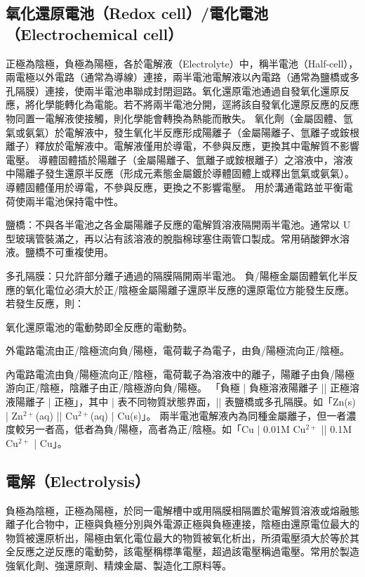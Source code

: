 \documentclass[a4paper,12pt]{article}
\begin{document}
\subsection{氧化還原電池（Redox cell）/電化電池（Electrochemical cell）}
正極為陰極，負極為陽極，各於電解液（Electrolyte）中，稱半電池（Half-cell），兩電極以外電路（通常為導線）連接，兩半電池電解液以內電路（通常為鹽橋或多孔隔膜）連接，使兩半電池串聯成封閉迴路。氧化還原電池通過自發氧化還原反應，將化學能轉化為電能。若不將兩半電池分開，逕將該自發氧化還原反應的反應物同置一電解液使接觸，則化學能會轉換為熱能而散失。
氧化劑（金屬固體、氫氣或氨氣）於電解液中，發生氧化半反應形成陽離子（金屬陽離子、氫離子或銨根離子）釋放於電解液中。電解液僅用於導電，不參與反應，更換其中電解質不影響電壓。
導體固體插於陽離子（金屬陽離子、氫離子或銨根離子）之溶液中，溶液中陽離子發生還原半反應（形成元素態金屬鍍於導體固體上或釋出氫氣或氨氣）。導體固體僅用於導電，不參與反應，更換之不影響電壓。
用於溝通電路並平衡電荷使兩半電池保持電中性。
\bit
\item 鹽橋：不與各半電池之各金屬陽離子反應的電解質溶液隔開兩半電池。通常以 U 型玻璃管裝滿之，再以沾有該溶液的脫脂棉球塞住兩管口製成。常用硝酸鉀水溶液。鹽橋不可重複使用。
\item 多孔隔膜：只允許部分離子通過的隔膜隔開兩半電池。
\eit
{}
負/陽極金屬固體氧化半反應的氧化電位必須大於正/陰極金屬陽離子還原半反應的還原電位方能發生反應。若發生反應，則：
\bit
\item 氧化還原電池的電動勢即全反應的電動勢。
\item 外電路電流由正/陰極流向負/陽極，電荷載子為電子，由負/陽極流向正/陰極。
\item 內電路電流由負/陽極流向正/陰極，電荷載子為溶液中的離子，陽離子由負/陽極游向正/陰極，陰離子由正/陰極游向負/陽極。
\eit
{}
「負極 | 負極溶液陽離子 || 正極溶液陽離子 | 正極」，其中 | 表不同物質狀態界面，|| 表鹽橋或多孔隔膜。如「Zn(s) | Zn$^{2+}$(aq) || Cu$^{2+}$(aq) | Cu(s)」。
兩半電池電解液內為同種金屬離子，但一者濃度較另一者高，低者為負/陽極，高者為正/陰極。如「Cu | 0.01M Cu$^{2+}$ || 0.1M Cu$^{2+}$ | Cu」。
\subsection{電解（Electrolysis）}
負極為陰極，正極為陽極，於同一電解槽中或用隔膜相隔置於電解質溶液或熔融態離子化合物中，正極與負極分別與外電源正極與負極連接，陰極由還原電位最大的物質被還原析出，陽極由氧化電位最大的物質被氧化析出，所須電壓須大於等於其全反應之逆反應的電動勢，該電壓稱標準電壓，超過該電壓稱過電壓。常用於製造強氧化劑、強還原劑、精煉金屬、製造化工原料等。
\end{document}
